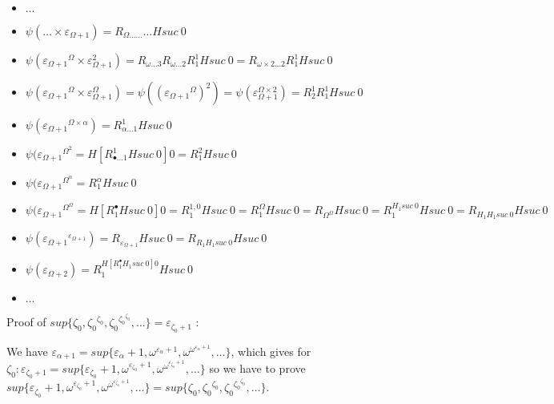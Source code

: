 \documentclass[10pt]{article}
\begin{document}
\begin{itemize}
\item \( \ldots \)

\item \( \psi(\ldots \times \varepsilon_{\Omega+1}) = R_{\Omega \ldots \ldots} \ldots H suc\ 0 \)

\item \( \psi({\varepsilon_{\Omega+1}}^\Omega \times \varepsilon_{\Omega+1}^2) = R_{\omega \ldots 3} R_{\omega \ldots 2} R^1_1 H suc\ 0 = R_{\omega \times 2 \ldots 2} R^1_1 H suc\ 0 \)

\item \( \psi({\varepsilon_{\Omega+1}}^\Omega \times \varepsilon_{\Omega+1}^\Omega) = \psi(({\varepsilon_{\Omega+1}}^\Omega)^2) = \psi(\varepsilon_{\Omega+1}^{\Omega \times 2}) = R^1_2 R^1_1 H suc\ 0 \)

\item \( \psi({\varepsilon_{\Omega+1}}^{\Omega \times \alpha}) = R^1_{\alpha \ldots 1} H suc\ 0 \)

\item \( \psi({\varepsilon_{\Omega+1}}^{\Omega^2} = H [R^1_{\bullet \ldots 1} H suc\ 0] 0 = R^2_1 H suc\ 0 \)

\item \( \psi({\varepsilon_{\Omega+1}}^{\Omega^\alpha} = R^\alpha_1 H suc\ 0 \)

\item \( \psi({\varepsilon_{\Omega+1}}^{\Omega^\Omega} = H [R^\bullet_1 H suc\ 0] 0 = R^{1,0}_1 H suc\ 0 = R^\Omega_1 H suc\ 0 = R_{\Omega^\Omega} H suc\ 0 = R^{H_1 suc\ 0}_1 H suc\ 0 = R_{H_1 H_1 suc\ 0} H suc\ 0 \)

\item \( \psi({\varepsilon_{\Omega+1}}^{\varepsilon_{\Omega+1}}) = R_{\varepsilon_{\Omega+1}} H suc\ 0 = R_{R_1 H_1 suc\ 0} H suc\ 0 \)

\item \( \psi({\varepsilon_{\Omega+2}}) = R^{H [R^\bullet_1 H_1 suc\ 0] 0}_1 H suc\ 0 \)

\item \( \ldots \)

\end{itemize}

Proof of \( sup \lbrace \zeta_0, {\zeta_0}^{\zeta_0}, {\zeta_0}^{{\zeta_0}^{\zeta_0}}, \ldots \rbrace = \varepsilon_{\zeta_0+1} \) :

We have \( \varepsilon_{\alpha+1} = sup \lbrace \varepsilon_\alpha+1, \omega^{\varepsilon_\alpha+1}, \omega^{\omega^{\varepsilon_\alpha+1}}, \ldots \rbrace \), which gives for \( \zeta_0 : \varepsilon_{\zeta_0+1} = sup \lbrace \varepsilon_{\zeta_0}+1, \omega^{\varepsilon_{\zeta_0}+1}, \omega^{\omega^{\varepsilon_{\zeta_0}+1}}, \ldots \rbrace \)
so we have to prove \( sup \lbrace \varepsilon_{\zeta_0}+1, \omega^{\varepsilon_{\zeta_0}+1}, \omega^{\omega^{\varepsilon_{\zeta_0}+1}}, \ldots \rbrace = sup \lbrace \zeta_0, {\zeta_0}^{\zeta_0}, {\zeta_0}^{{\zeta_0}^{\zeta_0}}, \ldots \rbrace \).
\end{document}
